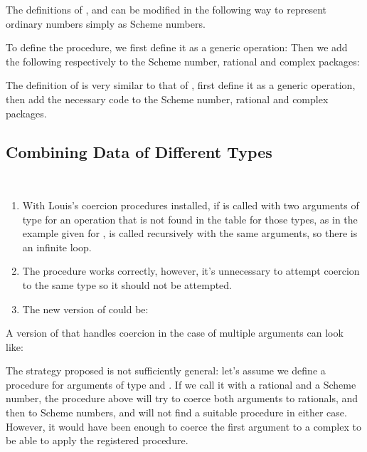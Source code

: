 \begin{exe}[2.78]
    The definitions of ,  and  
    can be modified in the following way to represent ordinary numbers simply as 
    Scheme numbers.
\end{exe}

\begin{exe}[2.79]
    To define the  procedure, we first define it as a generic 
    operation:
    Then we add the following respectively to the Scheme number, rational and 
    complex packages:
\end{exe}

\begin{exe}[2.80]
    The definition of  is very similar to that of , 
    first define it as a generic operation, then add the necessary code to the 
    Scheme number, rational and complex packages.
\end{exe}

\subsection{Combining Data of Different Types}

\begin{exe}[2.81]
    \ \vspace{-20pt}
    \begin{enumerate}
        \item With Louis’s coercion procedures installed, if 
             is called with two arguments of type 
             for an operation that is not found in the table for 
            those types, as in the example given for , 
             is called recursively with the same arguments, 
            so there is an infinite loop.
        \item The  procedure works correctly, however, it’s 
            unnecessary to attempt coercion to the same type so it should not be 
            attempted.
        \item The new version of  could be:
    \end{enumerate}
\end{exe}

\begin{exe}[2.82]
    A version of  that handles coercion in the case of 
    multiple arguments can look like:

    The strategy proposed is not sufficiently general: let’s assume we define 
    a procedure  for arguments of type  and 
    . If we call it with a rational and a Scheme number, the 
    procedure above will try to coerce both arguments to rationals, and then to 
    Scheme numbers, and will not find a suitable procedure in either case. 
    However, it would have been enough to coerce the first argument to a complex 
    to be able to apply the registered procedure.
\end{exe}

